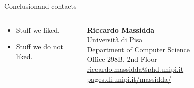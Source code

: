 \begin{frame}{Conclusion}{and contacts }
  \centering
  \begin{columns}
    \begin{column}{0.6\textwidth}
      \begin{itemize}
        \item Stuff we liked.
        \item Stuff we do not liked.
      \end{itemize}
    \end{column}
    \begin{column}{0.4\textwidth}
      \pause\textbf{Riccardo Massidda}\\
      {Università di Pisa}\\
      {Department of Computer Science}\\
      {Office 298B, 2nd Floor}\\[1em]
      \href{mailto:riccardo.massidda@phd.unipi.it}{riccardo.massidda@phd.unipi.it}
      \href{https://pages.di.unipi.it/massidda/}{pages.di.unipi.it/massidda/}
    \end{column}
  \end{columns}
\end{frame}
